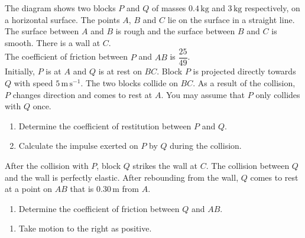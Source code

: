 \documentclass[leqno]{article}
\begin{document}
\begin{enumerate}[
  label=\textbf{\arabic*.},
  leftmargin=*,
  topsep=0pt,
  partopsep=0pt,
  parsep=0pt
]
\begin{figure}[H]
\end{figure}


The diagram shows two blocks $P$ and $Q$ of masses $0.4\,\mathrm{kg}$ and $3\,\mathrm{kg}$ respectively, on a horizontal surface. The points $A$, $B$ and $C$ lie on the surface in a straight line. The surface between $A$ and $B$ is rough and the surface between $B$ and $C$ is smooth. There is a wall at $C$. \\

The coefficient of friction between $P$ and $AB$ is $\dfrac{25}{49}$. \\

Initially, $P$ is at $A$ and $Q$ is at rest on $BC$. Block $P$ is projected directly towards $Q$ with speed $5\,\mathrm{m}\,\mathrm{s}^{-1}$. The two blocks collide on $BC$. As a result of the collision, $P$ changes direction and comes to rest at $A$. You may assume that $P$ only collides with $Q$ once. \\
\begin{enumerate}[label=\textbf{(\alph*)}]
  \item Determine the coefficient of restitution between $P$ and $Q$.  \\
  \item Calculate the impulse exerted on $P$ by $Q$ during the collision.  \\
\end{enumerate}
After the collision with $P$, block $Q$ strikes the wall at $C$. The collision between $Q$ and the wall is perfectly elastic. After rebounding from the wall, $Q$ comes to rest at a point on $AB$ that is $0.30\,\mathrm{m}$ from $A$. \\
\begin{enumerate}[label=\textbf{(\alph*)}, resume]
  \item Determine the coefficient of friction between $Q$ and $AB$.  \\
\end{enumerate}

\vspace*{10pt}

\begin{djsSolution}
\begin{enumerate}[label=\textbf{(\alph*)}]
  \item Take motion to the right as positive.


\end{enumerate}
\end{djsSolution}
\end{enumerate}
\end{document}
